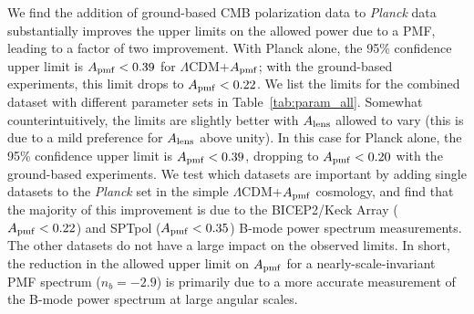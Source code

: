 \documentclass[apj]{emulateapj}
\newcommand{\apmf}{\ensuremath{A_{\rm pmf}}}
\newcommand{\alens}{\ensuremath{A_{\rm lens}}}
\newcommand{\lcdm}{\ensuremath{\Lambda}CDM}
\newcommand{\planck}{{\sl Planck}}
\newcommand{\bicepkeck}{BICEP2/Keck Array}
\newcommand{\sptpol}{SPTpol}
\begin{document}
We find the addition of ground-based CMB polarization data to \planck{} data substantially improves the upper limits on the allowed power due to a PMF, leading to a factor of two improvement. 
With Planck alone, the 95\% confidence upper limit is $\apmf <  \upperAplk$ for \lcdm{}+\apmf{}; with the ground-based experiments, this limit drops to $\apmf <  \upperAall$. 
We list the limits for the combined dataset  with different parameter sets in Table~\ref{tab:param_all}. 
Somewhat counterintuitively, the limits are slightly better with \alens{} allowed to vary (this is due to a mild preference for \alens{} above unity). 
In this case for  Planck alone, the 95\% confidence upper limit is $\apmf <  \upperAplkalens$, dropping to $\apmf <  \upperAallalens$ with the ground-based experiments. 
We test which datasets are important by adding single datasets to the \planck{} set in the simple \lcdm{}+\apmf{} cosmology, and find that the majority of this improvement is due to the \bicepkeck{} ($\apmf <  \upperAbicep$) and \sptpol{} ($\apmf <  \upperAsptpol$) B-mode power spectrum measurements. 
The other datasets do not have a large impact on the observed limits. 
In short, the reduction in the allowed upper limit on \apmf{} for a nearly-scale-invariant PMF spectrum ($n_b=-2.9$) is primarily due to a more accurate measurement of the B-mode power spectrum at large angular scales. 
\end{document}
